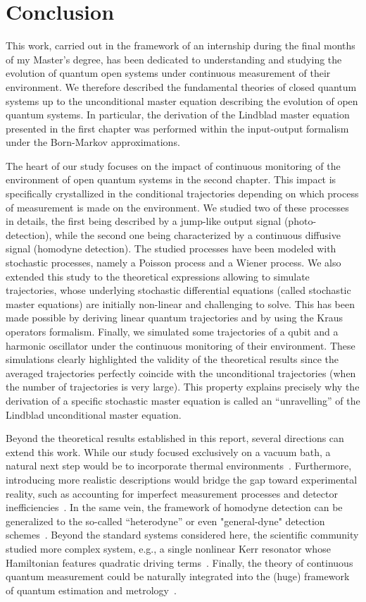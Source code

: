 \section*{\Huge Conclusion}
This work, carried out in the framework of an internship during the final months of my Master's degree, has been dedicated to understanding and studying the evolution of quantum open systems under continuous measurement of their environment. We therefore described the fundamental theories of closed quantum systems up to the unconditional master equation describing the evolution of open quantum systems. In particular, the derivation of the Lindblad master equation presented in the first chapter was performed within the input-output formalism under the Born-Markov approximations. 

The heart of our study focuses on the impact of continuous monitoring of the environment of open quantum systems in the second chapter. This impact is specifically crystallized in the conditional trajectories depending on which process of measurement is made on the environment. We studied two of these processes in details, the first being described by a jump-like output signal (photo-detection), while the second one being characterized by a continuous diffusive signal (homodyne detection). The studied processes have been modeled with stochastic processes, namely a Poisson process and a Wiener process. We also extended this study to the theoretical expressions allowing to simulate trajectories, whose underlying stochastic differential equations (called stochastic master equations) are initially non-linear and challenging to solve. This has been made possible by deriving linear quantum trajectories and by using the Kraus operators formalism. Finally, we simulated some trajectories of a qubit and a harmonic oscillator under the continuous monitoring of their environment. These simulations clearly highlighted the validity of the theoretical results since the averaged trajectories perfectly coincide with the unconditional trajectories (when the number of trajectories is very large). This property explains precisely why the derivation of a specific stochastic master equation is called an ``unravelling'' of the Lindblad unconditional master equation.

Beyond the theoretical results established in this report, several directions can extend this work. While our study focused exclusively on a vacuum bath, a natural next step would be to incorporate thermal environments~\cite{W93}. Furthermore, introducing more realistic descriptions would bridge the gap toward experimental reality, such as accounting for imperfect measurement processes and detector inefficiencies~\cite{Albarelli}. In the same vein, the framework of homodyne detection can be generalized to the so-called ``heterodyne'' or even "general-dyne" detection schemes~\cite{Albarelli, Jacobs2006, Genoni14}. Beyond the standard systems considered here, the scientific community studied more complex system, e.g., a single nonlinear Kerr resonator whose Hamiltonian features quadratic driving terms~\cite{Bartolo2017}. Finally, the theory of continuous quantum measurement could be naturally integrated into the (huge) framework of quantum estimation and metrology~\cite{PARIS2009, Rossi2020}.